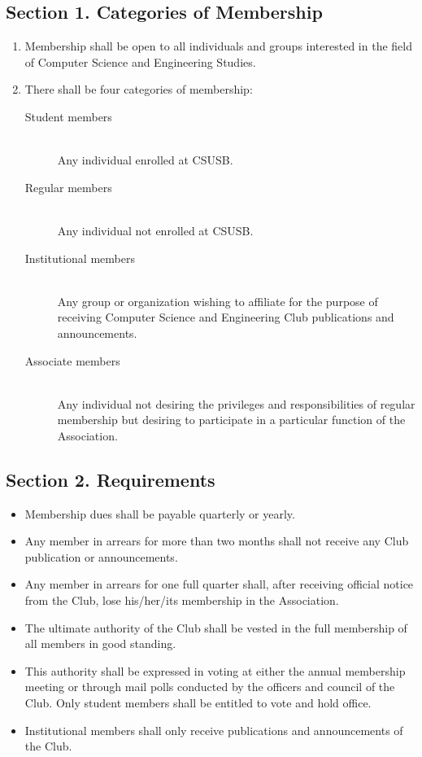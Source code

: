 \documentclass{article}
\begin{document}
  \subsection{Section 1. Categories of Membership}
    \begin{enumerate}
      \item Membership shall be open to all individuals and groups interested in the field of Computer Science and Engineering Studies.
      \item There shall be four categories of membership:
      \begin{description}
        \item[Student members] ~\\
          Any individual enrolled at CSUSB.
        \item[Regular members] ~\\
          Any individual not enrolled at CSUSB.
        \item[Institutional members] ~\\
          Any group or organization wishing to affiliate for the purpose of receiving Computer Science and Engineering Club publications and announcements.
        \item[Associate members] ~\\
          Any individual not desiring the privileges and responsibilities of regular membership but desiring to participate in a particular function of the Association.
      \end{description}
    \end{enumerate}

  \subsection{Section 2. Requirements}
    \begin{itemize}
      \item Membership dues shall be payable quarterly or yearly.
      \item Any member in arrears for more than two months shall not receive any Club publication or announcements.
      \item Any member in arrears for one full quarter shall, after receiving official notice from the Club, lose his/her/its membership in the Association.
      \item The ultimate authority of the Club shall be vested in the full membership of all members in good standing.
      \item This authority shall be expressed in voting at either the annual membership meeting or through mail polls conducted by the officers and council of the Club. Only student members shall be entitled to vote and hold office.
      \item Institutional members shall only receive publications and announcements of the Club.
    \end{itemize}
\end{document}
